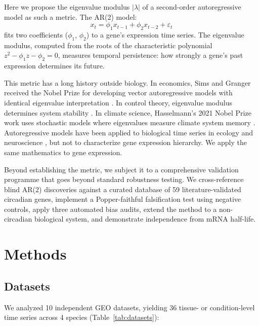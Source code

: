 \documentclass[11pt,letterpaper]{article}
\begin{document}
Here we propose the eigenvalue modulus $|\lambda|$ of a second-order autoregressive model as such a metric. The AR(2) model:
\begin{equation}
x_t = \phi_1 x_{t-1} + \phi_2 x_{t-2} + \varepsilon_t
\end{equation}
fits two coefficients ($\phi_1$, $\phi_2$) to a gene's expression time series. The eigenvalue modulus, computed from the roots of the characteristic polynomial $z^2 - \phi_1 z - \phi_2 = 0$, measures temporal persistence: how strongly a gene's past expression determines its future.

This metric has a long history outside biology. In economics, Sims and Granger received the Nobel Prize for developing vector autoregressive models with identical eigenvalue interpretation \citep{sims1980macroeconomics, granger1969investigating}. In control theory, eigenvalue modulus determines system stability \citep{ogata2010modern}. In climate science, Hasselmann's 2021 Nobel Prize work uses stochastic models where eigenvalues measure climate system memory \citep{hasselmann1976stochastic}. Autoregressive models have been applied to biological time series in ecology \citep{ives2003estimating} and neuroscience \citep{harrison2003autoregressive}, but not to characterize gene expression hierarchy. We apply the same mathematics to gene expression.

Beyond establishing the metric, we subject it to a comprehensive validation programme that goes beyond standard robustness testing. We cross-reference blind AR(2) discoveries against a curated database of 59 literature-validated circadian genes, implement a Popper-faithful falsification test using negative controls, apply three automated bias audits, extend the method to a non-circadian biological system, and demonstrate independence from mRNA half-life.

\section{Methods}

\subsection{Datasets}
\label{sec:datasets}

We analyzed 10 independent GEO datasets, yielding 36 tissue- or condition-level time series across 4 species (Table~\ref{tab:datasets}):
\end{document}
